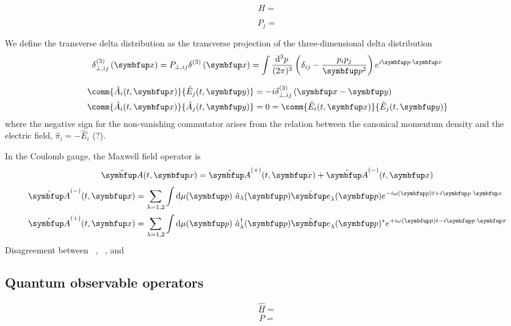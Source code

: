 \begin{equation}
	H
	=
\end{equation}

\begin{equation}
	P_j
	=
\end{equation}

We define the transverse delta distribution as the transverse projection of the three-dimensional delta distribution
\begin{equation}
	\delta_{\perp,ij}^{(3)}
	\left(\vb{x}\right)
	=
	P_{\perp,ij}
	\delta^{(3)}
	\left(\vb{x}\right)
	=
	\int\frac{\dd[3]{p}}{(2\pi)^3}
	\left(
		\delta_{ij}
		-
		\frac{p_ip_j}{\vb{p}^2}
	\right)
	e^{i\vb{p}\vdot\vb{x}}
\end{equation}

\begin{align}
	\comm{\hat{A}_i(t,\vb{x})}{\hat{E}_j(t,\vb{y})}
	&=
	-i
	\delta_{\perp,ij}^{(3)}
	\left(\vb{x}-\vb{y}\right)
	\\
	\comm{\hat{A}_i(t,\vb{x})}{\hat{A}_j(t,\vb{y})}
	&=
	0
	=
	\comm{\hat{E}_i(t,\vb{x})}{\hat{E}_j(t,\vb{y})}
\end{align}
where the negative sign for the non-vanishing commutator arises from the relation between the canonical momentum density and the electric field, $\hat\pi_i=-\hat{E}_i$ (?).

In the Coulomb gauge, the Maxwell field operator is
\begin{equation}
	\vu{A}(t,\vb{x})
	=
	\vu{A}^{(+)}(t,\vb{x})
	+
	\vu{A}^{(-)}(t,\vb{x})
\end{equation}
\begin{align}
	\vu{A}^{(-)}(t,\vb{x})
	&=
	\sum_{\lambda=1,2}
	\int\dd{\mu(\vb{p})}
	\hat{a}_\lambda(\vb{p})
	\vu{e}_\lambda(\vb{p})
	e^{-i\omega(\vb{p})t+i\vb{p}\vdot\vb{x}}
	\\
	\vu{A}^{(+)}(t,\vb{x})
	&=
	\sum_{\lambda=1,2}
	\int\dd{\mu(\vb{p})}
	\hat{a}_\lambda^\dagger(\vb{p})
	\vu{e}_\lambda(\vb{p})^*
	e^{+i\omega(\vb{p})t-i\vb{p}\vdot\vb{x}}
\end{align}
Disagreement between ~\cite[p.~341]{Srednicki2007}, ~\cite[p.~198]{Greiner2013}, and \cite[p.~123]{Peskin1995}

\subsection{Quantum observable operators}

\begin{equation}
	\hat{H}
	=
\end{equation}
\begin{equation}
	\hat{P}
	=
\end{equation}

